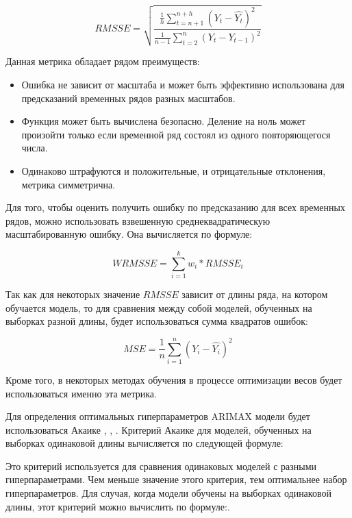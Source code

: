 \begin{equation}\label{eq:rmsse}
	RMSSE = \sqrt{ \frac{ \frac{1}{h} \sum_{t=n+1}^{n+h}(Y_t - \hat{Y_t})^2  }{ \frac{1}{n-1} \sum_{t=2}^{n} (Y_t - Y_{t-1})^2 } }
\end{equation}

Данная метрика обладает рядом преимуществ:

\begin{itemize}
	\item Ошибка не зависит от масштаба и может быть эффективно использована для предсказаний временных рядов разных масштабов.
	\item Функция может быть вычислена безопасно. Деление на ноль может произойти только если временной ряд состоял из одного повторяющегося числа.
	\item Одинаково штрафуются и положительные, и отрицательные отклонения, метрика симметрична.
\end{itemize}

Для того, чтобы оценить получить ошибку по предсказанию для всех временных рядов,
можно использовать взвешенную среднеквадратическую масштабированную ошибку.
Она вычисляется по формуле:

\begin{equation}\label{eq:wrmsse}
	WRMSSE = \sum_{i=1}^{k} w_i * RMSSE_i
\end{equation}

Так как для некоторых значение $ RMSSE $ зависит от длины ряда, на котором обучается
модель, то для сравнения между собой моделей, обученных на выборках разной длины,
будет использоваться сумма квадратов ошибок:

\begin{equation}\label{eq:mse}
	MSE = \frac{1}{n} \sum_{i=1}^{n} (Y_i  - \hat{Y_i})^2
\end{equation}

\noindent Кроме того, в некоторых методах обучения
в процессе оптимизации весов будет использоваться именно эта метрика.


Для определения оптимальных гиперпараметров ARIMAX модели будет использоваться Акаике \cite{sakamoto1986akaike}, \cite{akaike}, \cite{wagenmakers2004aic}.
Критерий Акаике для моделей, обученных на выборках одинаковой длины вычисляется по следующей
формуле:

Это критерий используется для сравнения одинаковых моделей с разными гиперпараметрами.
Чем меньше значение этого критерия, тем оптимальнее набор гиперпараметров.
Для случая, когда модели обучены на выборках одинаковой длины, этот критерий можно вычислить по формуле:.

